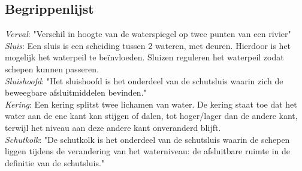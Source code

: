 \documentclass[../verslag.tex]{subfiles}
\begin{document}
\subsection{Begrippenlijst}
\emph{Verval}: "Verschil in hoogte van de waterspiegel op twee punten van een rivier" \cite{dvd_verval}\\
\emph{Sluis}: Een sluis is een scheiding tussen 2 wateren, met deuren. Hierdoor is het mogelijk het waterpeil te beïnvloeden. Sluizen reguleren het waterpeil zodat schepen kunnen passeren. \cite{rws_2022}\\
\emph{Sluishoofd}: "Het sluishoofd is het onderdeel van de schutsluis waarin zich de beweegbare afsluitmiddelen bevinden." \cite{bezuijen_2000}\\
\emph{Kering}: Een kering splitst twee lichamen van water. De kering staat toe dat het water aan de ene kant kan stijgen of dalen, tot hoger/lager dan de andere kant, terwijl het niveau aan deze andere kant onveranderd blijft. \cite{rws_2018}\\
\emph{Schutkolk}: "De schutkolk is het onderdeel van de schutsluis waarin de schepen liggen tijdens de verandering van het waterniveau: de afsluitbare ruimte in de definitie van de schutsluis." \cite{bezuijen_2000}
\end{document}
